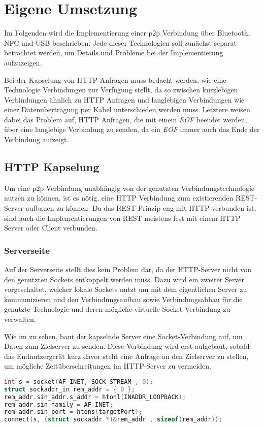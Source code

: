 \section{Eigene Umsetzung}
\label{section:implementation}
        Im Folgenden wird die Implementierung einer p2p Verbindung über Bluetooth, NFC und USB beschrieben. Jede dieser Technologien soll zunächst separat betrachtet werden, um Details und Probleme bei der Implementierung aufzuzeigen.
        
        Bei der Kapselung von HTTP Anfragen muss bedacht werden, wie eine Technologie Verbindungen zur Verfügung stellt, da so zwischen kurzlebigen Verbindungen ähnlich zu HTTP Anfragen und langlebigen Verbindungen wie einer Datenübertragung per Kabel unterschieden werden muss. Letztere weisen dabei das Problem auf, HTTP Anfragen, die mit einem {\it EOF} beendet werden, über eine langlebige Verbindung zu senden, da ein {\it EOF} immer auch das Ende der Verbindung aufzeigt.
        
    \subsection{HTTP Kapselung}
        Um eine p2p Verbindung unabhängig von der genutzten Verbindungstechnologie nutzen zu können, ist es nötig, eine HTTP Verbindung zum existierenden REST-Server aufbauen zu können. Da das REST-Prinzip eng mit HTTP verbunden ist, sind auch die Implementierungen von REST meistens fest mit einem HTTP Server oder Client verbunden.
    \subsubsection{Serverseite}        
        Auf der Serverseite stellt dies kein Problem dar, da der HTTP-Server nicht von den genutzten Sockets entkoppelt werden muss. Dazu wird ein zweiter Server vorgeschaltet, welcher lokale Sockets nutzt um mit dem eigentlichen Server zu kommunizieren und den Verbindungsaufbau sowie Verbindungsabbau für die genutzte Technologie und deren mögliche virtuelle Socket-Verbindung zu verwalten.
        
        Wie im  zu sehen, baut der kapselnde Server eine Socket-Verbindung auf, um Daten zum Zielserver zu senden. Diese Verbindung wird erst aufgebaut, sobald das Endnutzergerät kurz davor steht eine Anfrage an den Zielserver zu stellen, um mögliche Zeitüberschreitungen im HTTP-Server zu vermeiden.

        \begin{lstlisting}[frame=bt, label={lst:socket:create}, language=C, caption=Instanziierung eines Sockets (Servercode in C)]
int s = socket(AF_INET, SOCK_STREAM , 0);
struct sockaddr_in rem_addr = { 0 };
rem_addr.sin_addr.s_addr = htonl(INADDR_LOOPBACK);
rem_addr.sin_family = AF_INET;
rem_addr.sin_port = htons(targetPort);
connect(s, (struct sockaddr *)&rem_addr , sizeof(rem_addr));
        \end{lstlisting}        
        
